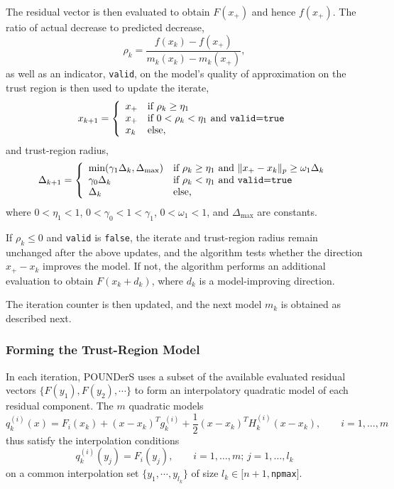 \documentclass[]{book}
\begin{document}
The residual vector is then evaluated to obtain $F(x_+)$ and hence
$f(x_+)$. The ratio of actual decrease to predicted decrease, 
\[
 \rho_k = \frac{f(x_k)-f(x_+)}{m_k(x_k)-m_k(x_+)},
\]
as well as an indicator, \texttt{valid}, on the model's quality of
approximation on the trust region is then used to update the iterate,
\[
x_{k+1} = \left\{\begin{array}{ll}
x_+ & \mbox{if } \rho_k \geq \eta_1 \\
x_+ & \mbox{if } 0<\rho_k <\eta_1  \mbox{ and \texttt{valid}=\texttt{true}}
\\
x_k & \mbox{else}, 
\end{array}
\right.
\]
and trust-region radius,
\[
\Delta_{k+1} = \left\{\begin{array}{ll}
 \mbox{min}(\gamma_1\Delta_k, \Delta_{\max}) & \mbox{if } \rho_k \geq
\eta_1 \mbox{ and } \|x_+-x_k\|_p\geq \omega_1\Delta_k \\
\gamma_0\Delta_k & \mbox{if } \rho_k < \eta_1 \mbox{ and
\texttt{valid}=\texttt{true}} \\
\Delta_k &  \mbox{else,}
\end{array}
\right.
\]
where $0 < \eta_1 < 1$,  $0 < \gamma_0 < 1 < \gamma_1$, $0<\omega_1<1$,
and $\Delta_{\max}$ are constants. 

If $\rho_k\leq 0$ and \texttt{valid} is \texttt{false}, the
iterate and trust-region radius remain unchanged after the above updates,
and the algorithm tests whether the direction $x_+-x_k$ improves the model. If
not, the algorithm performs an additional evaluation to obtain
$F(x_k+d_k)$, where $d_k$ is a model-improving direction. 

The iteration counter is then updated, and the next model $m_{k}$ is
obtained as described next.

\subsubsection{Forming the Trust-Region Model}
In each iteration, POUNDerS uses a subset of the available evaluated
residual vectors $\{ F(y_1), F(y_2), \cdots \}$ to form an interpolatory
quadratic model of each residual component. The $m$ quadratic models
\begin{equation}
 q_k^{(i)}(x) = 
 F_i(x_k) + (x-x_k)^T g_k^{(i)} + \frac{1}{2} (x-x_k)^T H_k^{(i)} (x-x_k), 
 \qquad i = 1, \ldots, m
\label{eq:models}
\end{equation}
thus satisfy the interpolation conditions 
\[ 
 q_k^{(i)}(y_j) = F_i(y_j), \qquad i=1, \ldots, m; \, j=1,\ldots , l_k
\]
on a common interpolation set $\{y_1, \cdots , y_{l_k}\}$ of size
$l_k\in[n+1,$\texttt{npmax}$]$.
\end{document}
